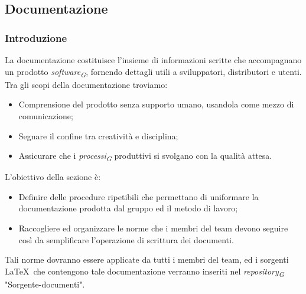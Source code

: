 \subsection{Documentazione}

\subsubsection{Introduzione}
La documentazione costituisce l'insieme di informazioni scritte che accompagnano un prodotto \textit{software}\textsubscript{\textit{G}}, fornendo dettagli utili a sviluppatori, distributori e utenti.\\
Tra gli scopi della documentazione troviamo:
\begin{itemize}
    \item Comprensione del prodotto senza supporto umano, usandola come mezzo di comunicazione;
    \item Segnare il confine tra creatività e disciplina;
    \item Assicurare che i \textit{processi}\textsubscript{\textit{G}} produttivi si svolgano con la qualità attesa.
\end{itemize}

L'obiettivo della sezione è:
\begin{itemize}
    \item  Definire delle procedure ripetibili che permettano di uniformare la documentazione prodotta dal gruppo ed il metodo di lavoro;
    \item  Raccogliere ed organizzare le norme che i membri del team devono seguire così da semplificare l'operazione di scrittura dei documenti.
\end{itemize}
Tali norme dovranno essere applicate da tutti i membri del team, ed i sorgenti \LaTeX\ che contengono tale documentazione verranno inseriti nel \textit{repository}\textsubscript{\textit{G}} "Sorgente-documenti".

\begin{comment} \paragraph*{Primi approcci alla redazione di documenti e problematiche riscontrate}
Per la composizione iniziale dei documenti richiesti per la candidatura, è stato sperimentato un'approccio che impiegava gli strumenti di Google Drive. Tale metodologia consentiva ai redattori di redigere agevolmente i documenti senza la necessità di padroneggiare la sintassi LaTeX, con l'intenzione di trasporre successivamente il contenuto in LaTeX una volta che fosse stato validato dai verificatori. Tuttavia, questo approccio ha suscitato problematiche, tra cui:
\begin{itemize}
    \item Rischio di incoerenza tra il contenuto presente negli strumenti di Google Drive.
    \item Prolungato impiego di tempo per la riscrittura in LaTeX, dovuto alla necessità di un passaggio aggiuntivo.
\end{itemize}
Per tali ragioni si è presa la decisione di adottare un nuovo approccio.
\end{comment}
